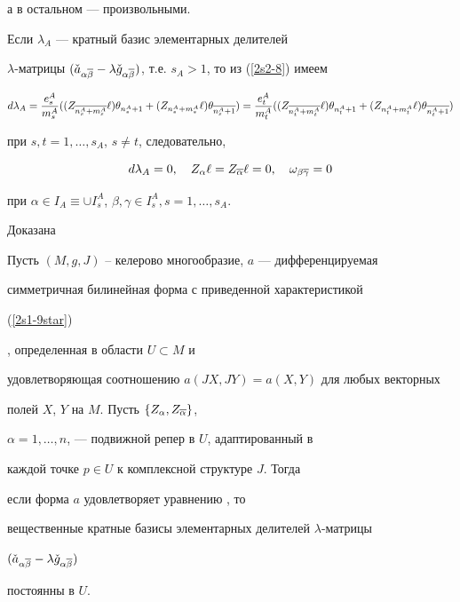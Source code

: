 а в остальном --- произвольными.





Если $\lambda_A$ --- кратный базис элементарных делителей


$\lambda$-матрицы $(\Check a_{\alpha\ol\beta}-\lambda \Check


g_{\alpha\ol\beta})$, т.е. $s_A > 1$, то из (\ref{2s2-8}) имеем


$$


d\lambda_A = \frac{e^A_s}{m^A_s}


((Z_{\ol {n^A_s + m^A_s}}\ell)\theta_{n_s^A +1} +


(Z_{n^A_s +m^A_s} \ell)\theta_{\ol {n^A_s +1}}) =


\frac{e^A_t}{m^A_t} ((Z_{\ol {n^A_t + m^A_t}}\ell)\theta_{n_t^A +1} +


(Z_{n^A_t +m^A_t} \ell) \theta_{\ol {n^A_t +1}})


$$


при $s,t =1,\dotsc,s_A$, $s\neq t$, следовательно,


\begin{equation}\label{2s2-9-2}


d\lambda_A = 0, \quad Z_\alpha \ell =Z_{\ol\alpha} \ell = 0,


\quad \omega_{\beta\ol\gamma} = 0


\end{equation}


при $\alpha \in I_A \equiv \cup I^A_s$, $\beta,\gamma \in I^A_s,


s=1,\dotsc,s_A$.





Доказана





\begin{lemnonum}




Пусть $(M,g,J)$ -- келерово многообразие, $a$ --- дифференцируемая


симметричная билинейная форма с приведенной характеристикой {\rom


{(\ref{2s1-9star})}}, определенная в области $U \subset M$ и


удовлетворяющая соотношению $a(JX,JY)=a(X,Y)$ для любых векторных


полей $X$, $Y$ на $M$. Пусть $\{ Z_\alpha,Z_{\overline\alpha}\}$,


$\alpha=1,\dotsc ,n$, --- подвижной репер в $U$, адаптированный в


каждой точке $p\in U$ к комплексной структуре $J$. Тогда


если форма $a$ удовлетворяет уравнению {\rom {(\ref{2s2-1})}}, то


вещественные кратные базисы элементарных делителей $\lambda$-матрицы


$(\Check a_{\alpha\overline\beta} - \lambda \Check g_{\alpha\overline\beta})$


постоянны в $U$.


\end{lemnonum}





